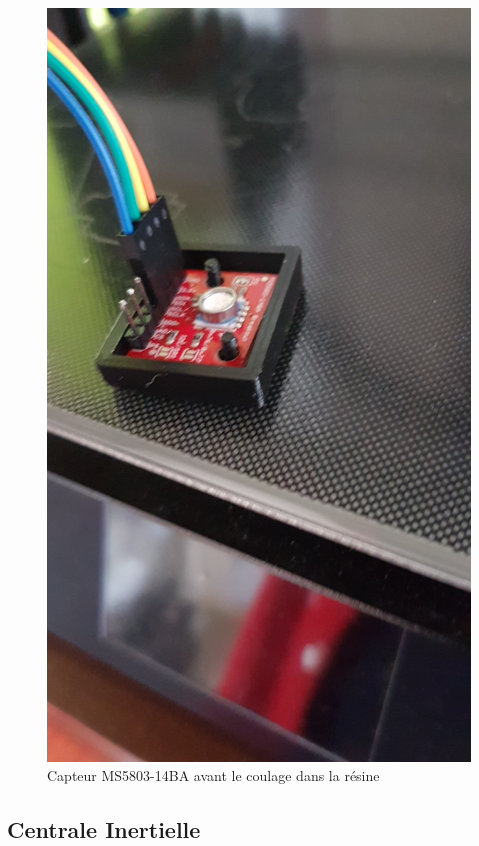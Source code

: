 \documentclass[a4paper,11pt]{report}
\begin{document}
				\begin{figure}[!h]
					\begin{center}
						\includegraphics[scale=0.2]{Photos/Capture40.jpeg}
						\caption{Capteur MS5803-14BA avant le coulage dans la résine}
					\end{center}
				\end{figure}
			\newpage
					
		\subsection{Centrale Inertielle}
		
\end{document}
